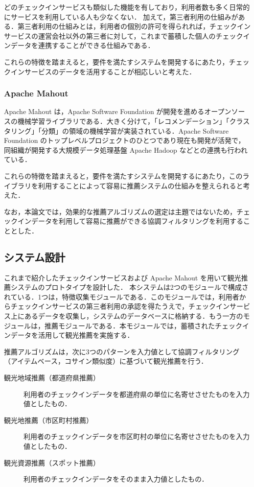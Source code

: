 \documentclass{jsarticle}
\begin{document}
どのチェックインサービスも類似した機能を有しており，利用者数も多く日常的にサービスを利用している人も少なくない．
加えて，第三者利用の仕組みがある．第三者利用の仕組みとは，利用者の個別の許可を得られれば，チェックインサービスの運営会社以外の第三者に対して，これまで蓄積した個人のチェックインデータを連携することができる仕組みである．

これらの特徴を踏まえると，要件を満たすシステムを開発するにあたり，チェックインサービスのデータを活用することが相応しいと考えた．

\subsubsection{Apache Mahout}

Apache Mahout は，Apache Software Foundation が開発を進めるオープンソースの機械学習ライブラリである．大きく分けて，「レコメンデーション」「クラスタリング」「分類」の領域の機械学習が実装されている．Apache Software Foundation のトップレベルプロジェクトのひとつであり現在も開発が活発で，同組織が開発する大規模データ処理基盤 Apache Hadoop などとの連携も行われている．

これらの特徴を踏まえると，要件を満たすシステムを開発するにあたり，このライブラリを利用することによって容易に推薦システムの仕組みを整えられると考えた．

なお，本論文では，効果的な推薦アルゴリズムの選定は主題ではないため，チェックインデータを利用して容易に推薦ができる協調フィルタリングを利用することとした．

\subsection{システム設計}

これまで紹介したチェックインサービスおよび Apache Mahout を用いて観光推薦システムのプロトタイプを設計した．
本システムは2つのモジュールで構成されている．1つは，特徴収集モジュールである．このモジュールでは，利用者からチェックインサービスの第三者利用の承認を得たうえで，チェックインサービス上にあるデータを収集し，システムのデータベースに格納する．もう一方のモジュールは，推薦モジュールである．本モジュールでは，蓄積されたチェックインデータを活用して観光推薦を実施する．

推薦アルゴリズムは，次に3つのパターンを入力値として協調フィルタリング（アイテムベース，コサイン類似度）に基づいて観光推薦を行う．

\begin{description}
\item[観光地域推薦（都道府県推薦）] 利用者のチェックインデータを都道府県の単位に名寄せさせたものを入力値としたもの．
\item[観光地推薦（市区町村推薦）] 利用者のチェックインデータを市区町村の単位に名寄せさせたものを入力値としたもの．
\item[観光資源推薦（スポット推薦）] 利用者のチェックインデータをそのまま入力値としたもの．
\end{description}
\end{document}
